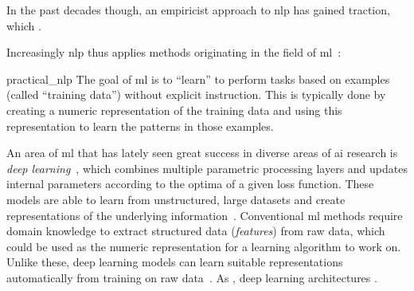 In the past decades though, an empiricist approach to \ac{nlp} has gained traction,
which .%

Increasingly \ac{nlp} thus applies methods originating in the field of \ac{ml}~\parencite[14-15]{practical_nlp}:
\begin{displaycquote}[15]{practical_nlp}
The goal of \acs{ml} is to \enquote{learn} to perform tasks based on examples (called \enquote{training data})
without explicit instruction.
This is typically done by creating a numeric representation \textelp{} of the training data
and using this representation to learn the patterns in those examples.
\end{displaycquote}
An area of \ac{ml} that has lately seen great success in diverse areas of \acl{ai} research is \emph{deep learning}~\parencites[1]{deep_learning}[16]{practical_nlp},
which combines multiple parametric processing layers and updates internal parameters
according to the optima of a given loss function.
These models are able to learn from unstructured, large datasets and create representations of the underlying information~\parencite[1]{deep_learning}.
Conventional \acl{ml} methods
require domain knowledge to extract structured data (\emph{features}) from raw data,
which could be used as the numeric representation for a learning algorithm to work on.
Unlike these, deep learning models can learn suitable representations automatically from training on raw data~\parencite[1]{deep_learning}.
As ,
deep learning architectures .

